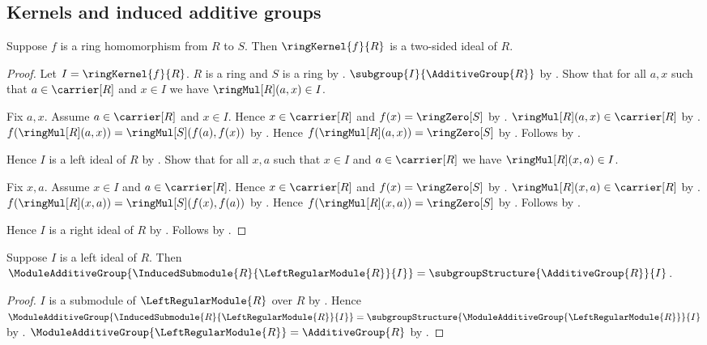 \subsection{Kernels and induced additive groups}

\begin{theorem}\label{ring_kernel_is_two_sided_ideal}
    Suppose $f$ is a ring homomorphism from $R$ to $S$.
    Then $\ringKernel{f}{R}$ is a two-sided ideal of $R$.
\end{theorem}
\begin{proof}
    Let $I=\ringKernel{f}{R}$.
    $R$ is a ring and $S$ is a ring by
        .
    $\subgroup{I}{\AdditiveGroup{R}}$ by
        .
    Show that for all $a,x$ such that $a\in\carrier[R]$ and $x\in I$ we have
        $\ringMul[R](a,x)\in I$.
    \begin{subproof}
        Fix $a,x$.
        Assume $a\in\carrier[R]$ and $x\in I$.
        Hence $x\in\carrier[R]$ and $f(x)=\ringZero[S]$ by
            .
        $\ringMul[R](a,x)\in\carrier[R]$ by .
        $f(\ringMul[R](a,x))=\ringMul[S](f(a),f(x))$ by
            .
        Hence $f(\ringMul[R](a,x))=\ringZero[S]$ by
            .
        Follows by .
    \end{subproof}
    Hence $I$ is a left ideal of $R$ by
        .
    Show that for all $x,a$ such that $x\in I$ and $a\in\carrier[R]$ we have
        $\ringMul[R](x,a)\in I$.
    \begin{subproof}
        Fix $x,a$.
        Assume $x\in I$ and $a\in\carrier[R]$.
        Hence $x\in\carrier[R]$ and $f(x)=\ringZero[S]$ by
            .
        $\ringMul[R](x,a)\in\carrier[R]$ by .
        $f(\ringMul[R](x,a))=\ringMul[S](f(x),f(a))$ by
            .
        Hence $f(\ringMul[R](x,a))=\ringZero[S]$ by
            .
        Follows by .
    \end{subproof}
    Hence $I$ is a right ideal of $R$ by
        .
    Follows by .
\end{proof}

\begin{theorem}\label{left_ideal_induced_additive_group}
    Suppose $I$ is a left ideal of $R$.
    Then
        $\ModuleAdditiveGroup{
            \InducedSubmodule{R}{\LeftRegularModule{R}}{I}}
        =\subgroupStructure{\AdditiveGroup{R}}{I}$.
\end{theorem}
\begin{proof}
    $I$ is a submodule of $\LeftRegularModule{R}$ over $R$ by
        .
    Hence
        $\ModuleAdditiveGroup{
            \InducedSubmodule{R}{\LeftRegularModule{R}}{I}}
        =\subgroupStructure{
            \ModuleAdditiveGroup{\LeftRegularModule{R}}}{I}$ by
        .
    $\ModuleAdditiveGroup{\LeftRegularModule{R}}
        =\AdditiveGroup{R}$ by
        .
\end{proof}
